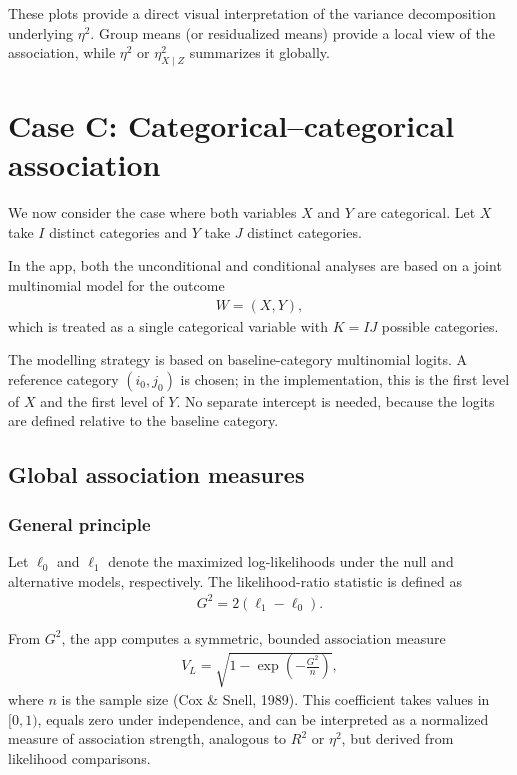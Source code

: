\documentclass[11pt,a4paper]{article}
\begin{document}
These plots provide a direct visual interpretation of the variance decomposition underlying $\eta^2$.
Group means (or residualized means) provide a local view of the association, while $\eta^2$ or $\eta^2_{X\mid Z}$ summarizes it globally.

\section{Case C: Categorical--categorical association}

We now consider the case where both variables $X$ and $Y$ are categorical.
Let $X$ take $I$ distinct categories and $Y$ take $J$ distinct categories.

In the app, both the unconditional and conditional analyses are based on a joint multinomial model for the outcome
\begin{align}
W = (X,Y),
\end{align}
which is treated as a single categorical variable with $K = IJ$ possible categories.

The modelling strategy is based on baseline-category multinomial logits. A reference category $(i_0,j_0)$ is chosen; in the implementation, this is the first level of $X$ and the first level of $Y$. No separate intercept is needed, because the logits are defined relative to the baseline category.

\subsection{Global association measures}

\subsubsection*{General principle}

Let $\ell_0$ and $\ell_1$ denote the maximized log-likelihoods under the null and alternative models, respectively. The likelihood-ratio statistic is defined as
\begin{align}
G^2 = 2(\ell_1 - \ell_0).
\end{align}

From $G^2$, the app computes a symmetric, bounded association measure
\begin{align}
V_L = \sqrt{1 - \exp\!\left(-\frac{G^2}{n}\right)},
\end{align}
where $n$ is the sample size (Cox \& Snell, 1989). This coefficient takes values in $[0,1)$, equals zero under independence, and can be interpreted as a normalized measure of association strength, analogous to $R^2$ or $\eta^2$, but derived from likelihood comparisons.
\end{document}
